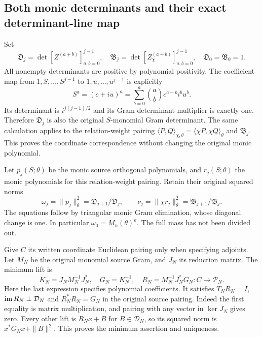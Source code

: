 \subsection{Both monic determinants and their exact determinant-line map}

Set
\[
 \mathfrak D_j=\det[Z^{(a+b)}]_{a,b=0}^{j-1},\quad
 \mathfrak B_j=\det[Z_\chi^{(a+b)}]_{a,b=0}^{j-1},\quad
 \mathfrak D_0=\mathfrak B_0=1.
 \tag{TVB.11}
\]
All nonempty determinants are positive by polynomial positivity.
The coefficient map from $1,S,\ldots,S^{j-1}$ to
$1,u,\ldots,u^{j-1}$ is explicitly
\[
 S^a=(c+iu)^a=\sum_{b=0}^a\binom ab c^{a-b}i^b u^b.
 \tag{TVB.12}
\]
Its determinant is $i^{j(j-1)/2}$ and its Gram determinant
multiplier is exactly one. Therefore $\mathfrak D_j$ is also
the original $S$-monomial Gram determinant. The same calculation
applies to the relation-weight pairing
$\langle P,Q\rangle_{\chi,\theta}=\langle\chi P,\chi Q\rangle_\theta$
and $\mathfrak B_j$. This proves the coordinate correspondence
without changing the original monic polynomial.

Let $p_j(S;\theta)$ be the monic source orthogonal polynomials,
and $r_j(S;\theta)$ the monic polynomials for this relation-weight
pairing. Retain their original squared norms
\[
 \omega_j=\|p_j\|_\theta^2=\mathfrak D_{j+1}/\mathfrak D_j,
 \qquad\nu_j=\|\chi r_j\|_\theta^2
               =\mathfrak B_{j+1}/\mathfrak B_j.
 \tag{TVB.13}
\]
The equations follow by triangular monic Gram elimination, whose
diagonal change is one. In particular $\omega_0=M_h(\theta)^k$.
The full mass has not been divided out.

Give $C$ its written coordinate Euclidean pairing only when
specifying adjoints. Let $M_N$ be the original monomial source
Gram, and $J_N$ its reduction matrix. The minimum lift is
\[
 K_N=J_NM_N^{-1}J_N^*,\quad G_N=K_N^{-1},\quad
 R_N=M_N^{-1}J_N^*G_N:C\longrightarrow\mathcal P_N.
 \tag{TVB.14}
\]
Here the last expression specifies polynomial coefficients.
It satisfies $T_NR_N=I$, $\operatorname{im} R_N\perp\mathcal D_N$ and
$R_N^*R_N=G_N$ in the original source pairing. Indeed the first
equality is matrix multiplication, and pairing with any vector
in $\ker J_N$ gives zero. Every other lift is $R_Nx+B$ for
$B\in\mathcal D_N$, so its squared norm is
$x^*G_Nx+\|B\|^2$. This proves the minimum assertion and
uniqueness.

